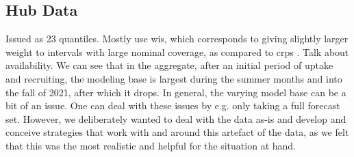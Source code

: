 \subsection{Hub Data}
Issued as 23 quantiles. Mostly use \ac{wis}, which corresponds to giving slightly larger weight to intervals with large nominal coverage, as compared to \ac{crps} \citep{bracher_evaluating_2021}.
Talk about availability. We can see that in the aggregate, after an initial period of uptake and recruiting, the modeling base is largest during the summer months and into the fall of 2021, after which it drops.
In general, the varying model base can be a bit of an issue. One can deal with these issues by e.g. only taking a full forecast set. However, we deliberately wanted to deal with the data as-is and develop and conceive strategies that work with and around this artefact of the data, as we felt that this was the most realistic and helpful for the situation at hand. 

